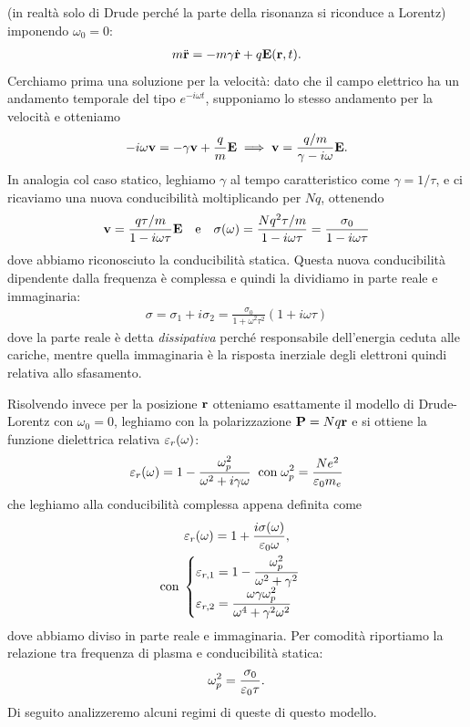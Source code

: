 (in realtà solo di Drude perché la parte della risonanza si riconduce a Lorentz) imponendo $ \omega_0 = 0 $:
\begin{align}
  m \ddot{\mathbf{r}} = - m \gamma \dot{\mathbf{r}} + q \mathbf{E}(\mathbf{r}, t).
\end{align}
Cerchiamo prima una soluzione per la velocità: dato che il campo elettrico ha 
un andamento temporale del tipo $ e^{-i\omega t} $, supponiamo lo stesso andamento per la velocità e otteniamo
\begin{align}
  -i\omega \mathbf{v} = -\gamma \mathbf{v} + \frac{q}{m} \mathbf{E} \implies \mathbf{v} = \frac{q/m}{\gamma - i \omega} \mathbf{E}.
\end{align}
In analogia col caso statico, leghiamo $ \gamma $ al tempo caratteristico come $ \gamma = 1/\tau $, e ci ricaviamo una nuova conducibilità moltiplicando 
per $ N q $, ottenendo 
\begin{align}
  \mathbf{v} = \frac{q \tau/m}{1 - i \omega \tau } \mathbf{E} \quad \textnormal{e} \quad \sigma(\omega) = \frac{{N q^2 \tau}/{m}}{1 - i \omega\tau} 
  = \frac{\sigma_0 }{1 - i \omega \tau}
\end{align}
dove abbiamo riconosciuto la conducibilità statica. Questa nuova conducibilità dipendente dalla frequenza è complessa e quindi la dividiamo in parte reale 
e immaginaria:
\begin{align}
  \sigma = \sigma_1 + i \sigma_2 = \frac{\sigma_0}{1 + \omega^2 \tau^2}\left( 1 + i \omega \tau \right)
\end{align}
dove la parte reale è detta \textit{dissipativa} perché responsabile dell'energia ceduta alle cariche, mentre quella immaginaria è la risposta inerziale 
degli elettroni quindi relativa allo sfasamento.

Risolvendo invece per la posizione $ \mathbf{r} $ otteniamo esattamente il modello di Drude-Lorentz con $ \omega_0 = 0 $, leghiamo con la polarizzazione 
$ \mathbf{P} = N q \mathbf{r} $ e si ottiene la funzione dielettrica relativa $ \varepsilon_r(\omega) $:
\begin{align}
  \varepsilon_r(\omega) = 1 - \frac{\omega_p^2}{\omega^2 + i \gamma \omega} \;\; \textnormal{con} \;  \omega_p^2 = \frac{N e^2 }{\varepsilon_0 m_e } 
\end{align}
che leghiamo alla conducibilità complessa appena definita come 
\begin{gather}
  \varepsilon_r( \omega) = 1 + \frac{i \sigma(\omega)}{\varepsilon_0 \omega}, 
  \\
  \textnormal{con} \;
  \begin{cases}
    \displaystyle \varepsilon_{r,1} = 1 - \frac{\omega_p^2}{\omega^2 + \gamma^2} 
    \\
    \displaystyle \varepsilon_{r,2} = \frac{\omega \gamma \omega_p^2}{\omega^4 + \gamma^2\omega^2}
  \end{cases}  
\end{gather}
dove abbiamo diviso in parte reale e immaginaria. Per comodità riportiamo la relazione tra frequenza di plasma e conducibilità statica:
\begin{align}
  \omega_p^2 = \frac{\sigma_0}{\varepsilon_0 \tau}.
\end{align}
Di seguito analizzeremo alcuni regimi di queste di questo modello.

